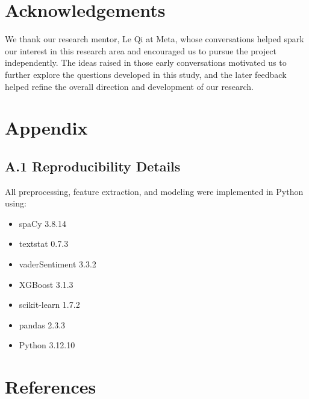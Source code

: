 \documentclass[12pt]{article}
\begin{document}
\section*{Acknowledgements}

We thank our research mentor, Le Qi at Meta, whose conversations helped spark our interest in this research area and encouraged us to pursue the project independently. The ideas raised in those early conversations motivated us to further explore the questions developed in this study, and the later feedback helped refine the overall direction and development of our research.




\section*{Appendix}

\subsection*{A.1 Reproducibility Details}

All preprocessing, feature extraction, and modeling were implemented in Python using:

\begin{itemize}
\item spaCy 3.8.14
\item textstat 0.7.3
\item vaderSentiment 3.3.2
\item XGBoost 3.1.3
\item scikit-learn 1.7.2
\item pandas 2.3.3
\item Python 3.12.10
\end{itemize}

\section*{References}
\end{document}
